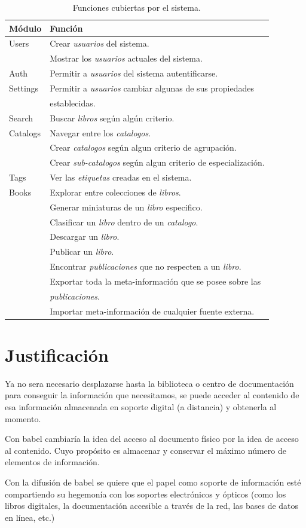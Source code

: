 \documentclass[letter,12pt]{article}
\begin{document}
\begin{table}
\begin{tabular}{l|l}
Módulo & Función \\
\hline
Users    & Crear \emph{usuarios} del sistema.                           \\
	     & Mostrar los \emph{usuarios} actuales del sistema. 			\\
Auth     & Permitir a \emph{usuarios} del sistema autentificarse.       \\
Settings & Permitir a \emph{usuarios} cambiar algunas de sus propiedades \\
	     & establecidas. \\ 
Search   & Buscar \emph{libros} según algún criterio. 					\\
Catalogs & Navegar entre los \emph{catalogos}.		 					\\
	     & Crear \emph{catalogos} según algun criterio de agrupación.   \\
	     & Crear \emph{sub-catalogos} según algun criterio de especialización. \\
Tags     & Ver las \emph{etiquetas} creadas en el sistema. 				\\
Books    & Explorar entre colecciones de \emph{libros}. 				\\
	     & Generar miniaturas de un \emph{libro} especifico.			\\
	     & Clasificar un \emph{libro} dentro de un \emph{catalogo}.     \\
	     & Descargar un \emph{libro}.									\\
	     & Publicar un \emph{libro}.                                    \\
	     & Encontrar \emph{publicaciones} que no respecten a un \emph{libro}. \\
	     & Exportar toda la meta-información que se posee sobre las     \\
	     & \emph{publicaciones}. \\
	     & Importar meta-información de cualquier fuente externa.       \\
\end{tabular}
\caption{Funciones cubiertas por el sistema.}
\label{funciones_actuales}
\end{table}

\section{Justificación}
Ya no sera necesario desplazarse hasta la biblioteca o centro de documentación para conseguir la
información que necesitamos, se puede acceder al contenido de esa información almacenada en soporte
digital (a distancia) y obtenerla al momento.

Con babel cambiaría la idea del acceso al documento físico por la idea de acceso al contenido. Cuyo propósito es almacenar y conservar el máximo número de elementos de información.

Con la difusión de babel se quiere que el papel como soporte de información esté compartiendo su
hegemonía con los soportes electrónicos y ópticos (como los libros digitales, la documentación
accesible a través de la red, las bases de datos en línea, etc.)
\end{document}
